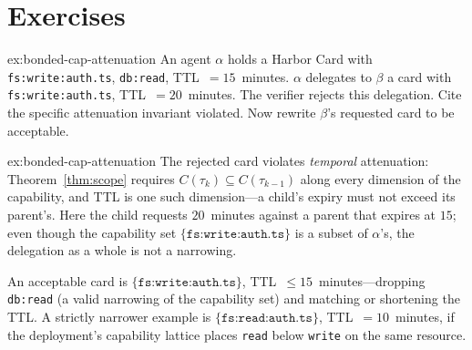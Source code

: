 \documentclass[11pt,a4paper]{article}
\theoremstyle{definition}
\theoremstyle{remark}
\begin{document}
\section{Exercises}
\label{sec:bonded-exercises}


\begin{pdexercise}[kind=Check,rating=1]{ex:bonded-cap-attenuation}
An agent $\alpha$ holds a Harbor Card with \texttt{fs:write:auth.ts}, \texttt{db:read}, TTL~$=15$~minutes. $\alpha$ delegates to $\beta$ a card with \texttt{fs:write:auth.ts}, TTL~$=20$~minutes. The verifier rejects this delegation. Cite the specific attenuation invariant violated. Now rewrite $\beta$'s requested card to be acceptable.
\end{pdexercise}
\begin{pdsolution}{ex:bonded-cap-attenuation}
The rejected card violates \emph{temporal} attenuation: Theorem~\ref{thm:scope} requires $C(\tau_{k}) \subseteq C(\tau_{k-1})$ along every dimension of the capability, and TTL is one such dimension---a child's expiry must not exceed its parent's. Here the child requests $20$~minutes against a parent that expires at $15$; even though the capability set $\{\texttt{fs:write:auth.ts}\}$ is a subset of $\alpha$'s, the delegation as a whole is not a narrowing.

An acceptable card is $\{\texttt{fs:write:auth.ts}\}$, TTL~$\le 15$~minutes---dropping \texttt{db:read} (a valid narrowing of the capability set) and matching or shortening the TTL. A strictly narrower example is $\{\texttt{fs:read:auth.ts}\}$, TTL~$=10$~minutes, if the deployment's capability lattice places \texttt{read} below \texttt{write} on the same resource.
\end{pdsolution}

\end{document}
